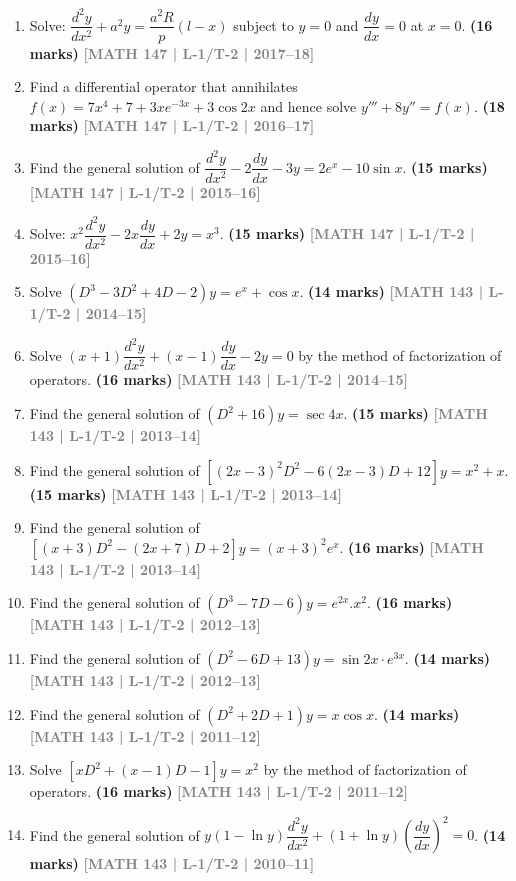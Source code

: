 \documentclass[12pt,a3paper]{article}
\newcommand{\yr}[1]{\hfill\textcolor{gray}{\small\textbf{[#1]}}}
\newcommand{\mk}[1]{\textcolor{orange!70!black}{\small\textbf{(#1 marks)}}}
\begin{document}
\begin{enumerate}
\item Solve: $\dfrac{d^{2}y}{dx^{2}}+a^{2}y=\dfrac{a^{2}R}{p}(l-x)$ subject to $y=0$ and $\dfrac{dy}{dx}=0$ at $x=0$.
\mk{16} \yr{MATH 147 | L-1/T-2 | 2017--18}

\item Find a differential operator that annihilates $f(x)=7x^{4}+7+3xe^{-3x}+3\cos 2x$ and hence solve $y'''+8y''=f(x)$.
\mk{18} \yr{MATH 147 | L-1/T-2 | 2016--17}

\item Find the general solution of $\dfrac{d^{2}y}{dx^{2}}-2\dfrac{dy}{dx}-3y=2e^{x}-10\sin x$.
\mk{15} \yr{MATH 147 | L-1/T-2 | 2015--16}

\item Solve: $x^{2}\dfrac{d^{2}y}{dx^{2}}-2x\dfrac{dy}{dx}+2y=x^{3}$.
\mk{15} \yr{MATH 147 | L-1/T-2 | 2015--16}

\item Solve $(D^{3}-3D^{2}+4D-2)y=e^{x}+\cos x$.
\mk{14} \yr{MATH 143 | L-1/T-2 | 2014--15}

\item Solve $(x+1)\dfrac{d^{2}y}{dx^{2}}+(x-1)\dfrac{dy}{dx}-2y=0$ by the method of factorization of operators.
\mk{16} \yr{MATH 143 | L-1/T-2 | 2014--15}

\item Find the general solution of $(D^{2}+16)y=\sec 4x$.
\mk{15} \yr{MATH 143 | L-1/T-2 | 2013--14}

\item Find the general solution of $[(2x-3)^{2}D^{2}-6(2x-3)D+12]y=x^{2}+x$.
\mk{15} \yr{MATH 143 | L-1/T-2 | 2013--14}

\item Find the general solution of $[(x+3)D^{2}-(2x+7)D+2]y=(x+3)^{2}e^{x}$.
\mk{16} \yr{MATH 143 | L-1/T-2 | 2013--14}

\item Find the general solution of $(D^{3}-7D-6)y=e^{2x}.x^{2}$.
\mk{16} \yr{MATH 143 | L-1/T-2 | 2012--13}

\item Find the general solution of $(D^{2}-6D+13)y=\sin 2x\cdot e^{3x}$.
\mk{14} \yr{MATH 143 | L-1/T-2 | 2012--13}

\item Find the general solution of $(D^{2}+2D+1)y=x\cos x$.
\mk{14} \yr{MATH 143 | L-1/T-2 | 2011--12}

\item Solve $[xD^{2}+(x-1)D-1]y=x^{2}$ by the method of factorization of operators.
\mk{16} \yr{MATH 143 | L-1/T-2 | 2011--12}

\item Find the general solution of $y(1-\ln y)\dfrac{d^{2}y}{dx^{2}}+(1+\ln y)\left(\dfrac{dy}{dx}\right)^{2}=0$.
\mk{14} \yr{MATH 143 | L-1/T-2 | 2010--11}

\end{enumerate}
\end{document}
